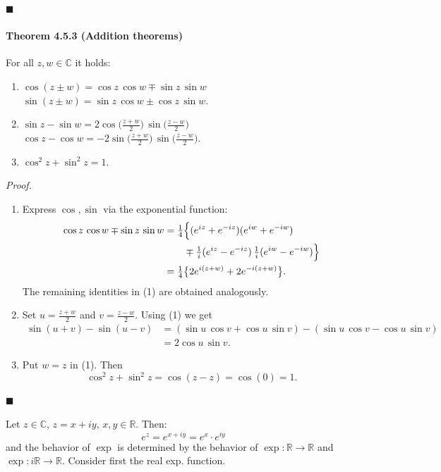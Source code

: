 \documentclass[12pt]{article}
\newcommand{\R}{\mathbb{R}}
\newcommand{\C}{\mathbb{C}}
\begin{document}
	\hfill$\blacksquare$

	\paragraph{Theorem 4.5.3 (Addition theorems)} For all $z,w\in\mathbb C$ it holds:
	\begin{enumerate}[label=({\arabic*})]
		\item $\cos(z\pm w) = \cos z\,\cos w \mp \sin z\,\sin w$\\
					$\sin(z\pm w) = \sin z\,\cos w \pm \cos z\,\sin w$.
		\item $\sin z - \sin w = 2\cos\bigl(\tfrac{z+w}{2}\bigr)\,\sin\bigl(\tfrac{z-w}{2}\bigr)$\\
					$\cos z - \cos w = -2\sin\bigl(\tfrac{z+w}{2}\bigr)\,\sin\bigl(\tfrac{z-w}{2}\bigr)$.
		\item $\cos^{2}z + \sin^{2}z = 1$.
	\end{enumerate}

	\emph{Proof.}
	\begin{enumerate}[label=({\arabic*})]
		\item Express $\cos,\sin$ via the exponential function:
		\begin{align*}
			\cos z\,\cos w \mp \sin z\,\sin w
			&= \tfrac{1}{4}\Bigl\{(e^{iz}+e^{-iz})(e^{iw}+e^{-iw}) \\
			&\qquad \mp \tfrac{1}{i}(e^{iz}-e^{-iz})\,\tfrac{1}{i}(e^{iw}-e^{-iw})\Bigr\} \\
			&= \tfrac{1}{4}\bigl\{2e^{i(z+w)} + 2e^{-i(z+w)}\bigr\}.
		\end{align*}
		The remaining identities in (1) are obtained analogously.
		\item Set $u = \tfrac{z+w}{2}$ and $v = \tfrac{z-w}{2}$. Using (1) we get
		\begin{align*}
			\sin(u+v) - \sin(u-v)
			&= (\sin u\,\cos v + \cos u\,\sin v) - (\sin u\,\cos v - \cos u\,\sin v) \\
			&= 2\cos u\,\sin v.
		\end{align*}
		\item Put $w = z$ in (1). Then
		\[
			\cos^{2}z + \sin^{2}z = \cos(z-z) = \cos(0) = 1.
		\]
	\end{enumerate}
	\hfill $\blacksquare$

	Let $z \in \C$, $z = x + iy$, $x, y \in \R$. Then:
\[
    e^z = e^{x+iy} = e^x \cdot e^{iy}
\]
and the behavior of $\exp$ is determined by the behavior of $\exp : \R \to \R$ and $\exp : i\R \to \R$.
Consider first the real exp. function.
\end{document}
